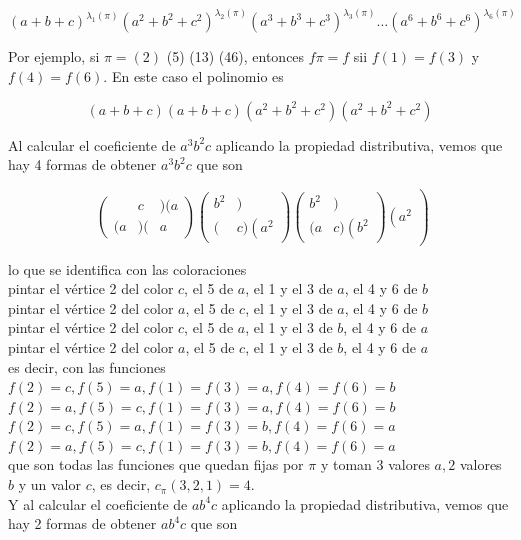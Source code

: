 \documentclass[10pt]{article}
\begin{document}
$$
(a+b+c)^{\lambda_{1}(\pi)}\left(a^{2}+b^{2}+c^{2}\right)^{\lambda_{2}(\pi)}\left(a^{3}+b^{3}+c^{3}\right)^{\lambda_{3}(\pi)} \ldots\left(a^{6}+b^{6}+c^{6}\right)^{\lambda_{6}(\pi)}
$$

Por ejemplo, si $\pi=(2)$ (5) (13) (46), entonces $f \pi=f$ sii $f(1)=f(3)$ y $f(4)=f(6)$. En este caso el polinomio es

$$
(a+b+c)(a+b+c)\left(a^{2}+b^{2}+c^{2}\right)\left(a^{2}+b^{2}+c^{2}\right)
$$

Al calcular el coeficiente de $a^{3} b^{2} c$ aplicando la propiedad distributiva, vemos que hay 4 formas de obtener $a^{3} b^{2} c$ que son

$$
\left.\begin{array}{l}
\left(\begin{array}{lll} 
& c & )(a \\
(a & )( & a
\end{array}\right)\left(\begin{array}{ll}
b^{2} & ) \\
( & c)\left(a^{2}\right.
\end{array}\right)\left(\begin{array}{ll}
b^{2} & ) \\
(a & c)\left(b^{2}\right.
\end{array}\right)\left(a^{2}\right.
\end{array}\right)
$$

lo que se identifica con las coloraciones\\
pintar el vértice 2 del color $c$, el 5 de $a$, el 1 y el 3 de $a$, el 4 y 6 de $b$\\
pintar el vértice 2 del color $a$, el 5 de $c$, el 1 y el 3 de $a$, el 4 y 6 de $b$\\
pintar el vértice 2 del color $c$, el 5 de $a$, el 1 y el 3 de $b$, el 4 y 6 de $a$\\
pintar el vértice 2 del color $a$, el 5 de $c$, el 1 y el 3 de $b$, el 4 y 6 de $a$\\
es decir, con las funciones\\
$f(2)=c, f(5)=a, f(1)=f(3)=a, f(4)=f(6)=b$\\
$f(2)=a, f(5)=c, f(1)=f(3)=a, f(4)=f(6)=b$\\
$f(2)=c, f(5)=a, f(1)=f(3)=b, f(4)=f(6)=a$\\
$f(2)=a, f(5)=c, f(1)=f(3)=b, f(4)=f(6)=a$\\
que son todas las funciones que quedan fijas por $\pi$ y toman 3 valores $a, 2$ valores $b$ y un valor $c$, es decir, $c_{\pi}(3,2,1)=4$.\\
Y al calcular el coeficiente de $a b^{4} c$ aplicando la propiedad distributiva, vemos que hay 2 formas de obtener $a b^{4} c$ que son
\end{document}
